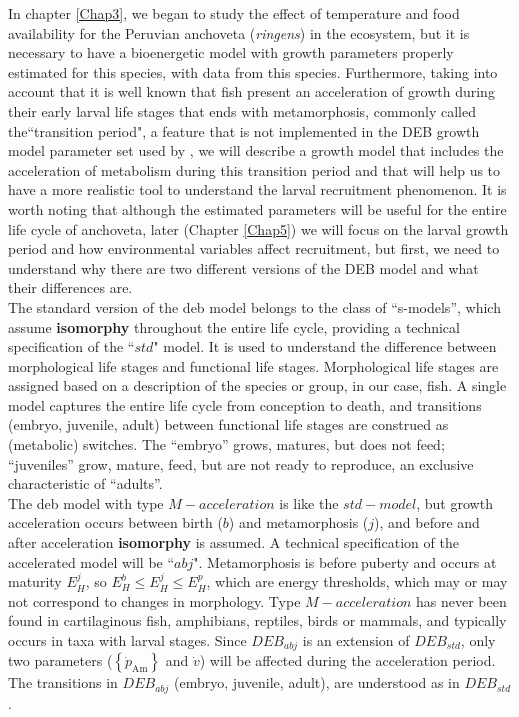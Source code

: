 In chapter \ref{Chap3}, we began to study the effect of temperature and food availability for the Peruvian anchoveta (\textit{\gls{ringens}}) in the ecosystem, but it is necessary to have a bioenergetic model with growth parameters properly estimated for this species, with data from this species. Furthermore, taking into account that it is well known that fish present an acceleration of growth during their early larval life stages that ends with metamorphosis, commonly called the``transition period", a feature that is not implemented in the DEB growth model parameter set used by \citep{PethRoos2013}, we will describe a growth model that includes the acceleration of metabolism during this transition period and that will help us to have a more realistic tool to understand the larval recruitment phenomenon. It is worth noting that although the estimated parameters will be useful for the entire life cycle of anchoveta, later (Chapter \ref{Chap5}) we will focus on the larval growth period and how environmental variables affect recruitment, but first, we need to understand why there are two different versions of the DEB model and what their differences are.\\

The standard version of the \acrshort{deb} model belongs to the class of ``s-models'', which assume \textbf{isomorphy} throughout the entire life cycle, providing a technical specification of the ``$std$" model. It is used to understand the difference between morphological life stages and functional life stages. Morphological life stages are assigned based on a description of the species or group, in our case, fish. A single model captures the entire life cycle from conception to death, and transitions (embryo, juvenile, adult) between functional life stages are construed as (metabolic) switches. The ``embryo'' grows, matures, but does not feed; ``juveniles'' grow, mature, feed, but are not ready to reproduce, an exclusive characteristic of ``adults''.\\

The \acrshort{deb} model with type $M-acceleration$ is like the $std-model$, but growth acceleration occurs between birth ($b$) and metamorphosis ($j$), and before and after acceleration \textbf{isomorphy} is assumed. A technical specification of the accelerated model will be ``$abj$". Metamorphosis is before puberty and occurs at maturity $E_{H}^j$, so $E_{H}^b \leq E_{H}^j \leq E_{H}^p$, which are energy thresholds, which may or may not correspond to changes in morphology. Type $M-acceleration$ has never been found in cartilaginous fish, amphibians, reptiles, birds or mammals, and typically occurs in taxa with larval stages. Since $DEB_{abj}$ is an extension of $DEB_{std}$, only two parameters ($\left \{ \dot{p}_\mathrm{Am} \right \}$ and $\dot{v}$) will be affected during the acceleration period. The transitions in $DEB_{abj}$ (embryo, juvenile, adult), are understood as in $DEB_{std}$.\\

